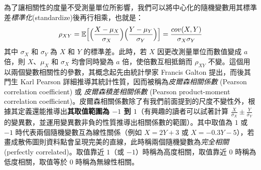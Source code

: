     \medskip

    為了讓相關性的度量不受測量單位所影響，我們可以將中心化的隨機變數用其標準差\textit{標準化}(standardize)後再行相乘，也就是：
    \smallskip
    \[\rho_{XY} = \mathbb{E}\Big[\Big(\frac{X - \mu_X}{\sigma_X}\Big)\Big(\frac{Y - \mu_Y}{\sigma_Y}\Big)\Big] = \frac{cov(X,Y)}{\sigma_X \sigma_Y}\]
    \smallskip
    其中 $\sigma_X$ 和 $\sigma_Y$ 為 $X$ 和 $Y$ 的標準差。此時，若 $X$ 因更改測量單位而數值變成 $a$ 倍，則 $X$、$\mu_X$ 和 $\sigma_X$ 均會同時變為 $a$ 倍，使倍數互相抵銷而 $\rho_{XY}$ 不變。這個用以兩個變數相關性的參數，其概念起先由統計學家 Francis Galton 提出，而後其門生 Karl Pearson 詳細推導其統計性質，因而被稱為\textit{皮爾森相關係數} (Pearson correlation coefficient) 或 \textit{皮爾森積差相關係數} (Pearson product-moment correlation coefficient)。皮爾森相關係數除了有我們前面提到的尺度不變性外，根據其定義還能推導出\textbf{其取值範圍為 $-1$ 到 $1$}（有興趣的讀者可以試著計算 $\frac{X}{\sigma_X} \pm \frac{Y}{\sigma_Y}$ 的變異數，並運用變異數非負的性質推導出相關係數的範圍）。其中取值為 $1$ 或 $-1$ 時代表兩個隨機變數互為線性關係（例如 $X = 2Y+3$ 或 $X = -0.3Y-5$），若畫成散佈圖則資料點會呈現完美的直線，此時稱兩個隨機變數為\textit{完全相關} (perfectly correlated)。取值靠近 $1$（或 $-1$）時稱為高度相關，取值靠近 $0$ 時稱為低度相關，取值等於 $0$ 時稱為無線性相關。

    \medskip
    
